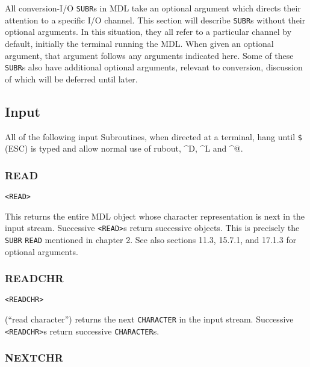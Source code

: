 \documentclass[a4paper]{scrbook}
\begin{document}
All conversion-I/O \texttt{SUBR}s in MDL take an optional argument which directs their attention to a specific I/O channel.
This section will describe \texttt{SUBR}s without their optional arguments. In this situation, they all refer to a
particular channel by default, initially the terminal running the MDL. When given an optional argument, that argument
follows any arguments indicated here. Some of these \texttt{SUBR}s also have additional optional arguments, relevant to
conversion, discussion of which will be deferred until later.

\subsection{Input}\label{input}

All of the following input Subroutines, when directed at a terminal, hang until \texttt{\$} \index{\texttt{\$}} (ESC) is
typed and allow normal use of rubout, \^{}D, \^{}L and
\^{}@.

\subsubsection{READ}\label{read}

\begin{verbatim}
<READ>
\end{verbatim}

 This returns the entire MDL object whose character representation is next in the input stream.
Successive \texttt{\textless{}READ\textgreater{}}s return successive objects. This is precisely the \texttt{SUBR}
\texttt{READ} mentioned in chapter 2. See also sections 11.3, 15.7.1, and 17.1.3 for optional arguments.

\subsubsection{READCHR}\label{readchr}

\begin{verbatim}
<READCHR>
\end{verbatim}

 (``read character'') returns the next \texttt{CHARACTER} in the input stream. Successive
\texttt{\textless{}READCHR\textgreater{}}s return successive \texttt{CHARACTER}s.

\subsubsection{NEXTCHR}\label{nextchr}
\end{document}

